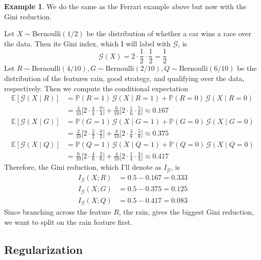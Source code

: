 \documentclass{article}
\theoremstyle{definition}
\newtheorem{example}{Example}[section]
\begin{document}
  \begin{example}
  We do the same as the Ferrari example above but now with the Gini reduction. 

  Let $X \sim \mathrm{Bernoulli}(1/2)$ be the distribution of whether a car wins a race over the data. Then its Gini index, which I will label with $\mathcal{G}$, is \[\mathcal{G} (X) = 2 \cdot \frac{1}{2} \cdot \frac{1}{2} = \frac{1}{2}\]
  Let $R \sim \mathrm{Bernoulli}(4/10), G \sim \mathrm{Bernoulli}(2/10), Q \sim \mathrm{Bernoulli}(6/10)$ be the distribution of the features rain, good strategy, and qualifying over the data, respectively. Then we compute the conditional expectation 
  \begin{align*}
      \mathbb{E}[\mathcal{G}(X \mid R)] & = \mathbb{P}(R = 1)\, \mathcal{G}(X \mid R = 1) + \mathbb{P}(R = 0) \, \mathcal{G}(X \mid R = 0) \\ 
      & = \frac{4}{10} \bigg[ 2 \cdot \frac{4}{4} \cdot \frac{0}{4} \bigg] + \frac{6}{10} \bigg[ 2 \cdot \frac{1}{6} \cdot \frac{5}{6} \bigg] \approx 0.167 \\
      \mathbb{E}[\mathcal{G}(X \mid G)] & = \mathbb{P}(G = 1)\, \mathcal{G}(X \mid G = 1) + \mathbb{P}(G = 0) \, \mathcal{G}(X \mid G = 0) \\ 
      & = \frac{2}{10} \bigg[ 2 \cdot \frac{2}{2} \cdot \frac{0}{2} \bigg] + \frac{8}{10} \bigg[ 2 \cdot \frac{3}{8} \cdot \frac{5}{8} \bigg] \approx 0.375 \\
      \mathbb{E}[\mathcal{G}(X \mid Q)] & = \mathbb{P}(Q = 1)\, \mathcal{G}(X \mid Q = 1) + \mathbb{P}(Q = 0) \, \mathcal{G}(X \mid Q = 0) \\ 
      & = \frac{6}{10} \bigg[ 2 \cdot \frac{4}{6} \cdot \frac{2}{6} \bigg] + \frac{4}{10} \bigg[ 2 \cdot \frac{1}{4} \cdot \frac{3}{4} \bigg] \approx 0.417
  \end{align*}
  Therefore, the Gini reduction, which I'll denote as $I_{\mathcal{G}}$, is 
  \begin{align*}
      I_{\mathcal{G}} (X ; R) & = 0.5 - 0.167 = 0.333 \\
      I_{\mathcal{G}} (X ; G) & = 0.5 - 0.375 = 0.125 \\
      I_{\mathcal{G}} (X ; Q) & = 0.5 - 0.417 = 0.083
  \end{align*}
  Since branching across the feature $R$, the rain, gives the biggest Gini reduction, we want to split on the rain feature first. 
  \end{example}


  \subsection{Regularization}
\end{document}
